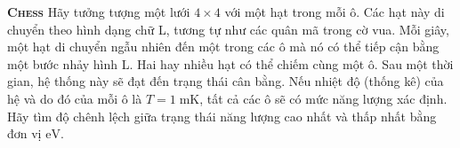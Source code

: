 \begin{problem}{\textbf{\textsc{Chess}}}
	Hãy tưởng tượng một lưới $4 \times 4$ với một hạt trong mỗi ô. Các hạt này di chuyển theo hình dạng chữ L, tương tự như các quân mã trong cờ vua. Mỗi giây, một hạt di chuyển ngẫu nhiên đến một trong các ô mà nó có thể tiếp cận bằng một bước nhảy hình L. Hai hay nhiều hạt có thể chiếm cùng một ô. Sau một thời gian, hệ thống này sẽ đạt đến trạng thái cân bằng. Nếu nhiệt độ (thống kê) của hệ và do đó của mỗi ô là $T=1\; \mathrm{mK}$, tất cả các ô sẽ có mức năng lượng xác định. Hãy tìm độ chênh lệch giữa trạng thái năng lượng cao nhất và thấp nhất bằng đơn vị $\mathrm{eV}$.
	
	
	
	
	
	
	
\end{problem}